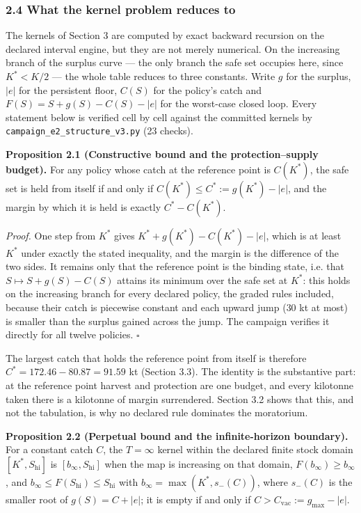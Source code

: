 \documentclass[11pt]{article}
\begin{document}
\subsubsection{2.4 What the kernel problem reduces
to}\label{budget-what-the-kernel-problem-reduces-to}

The kernels of Section 3 are computed by exact backward recursion on the
declared interval engine, but they are not merely numerical. On the increasing
branch of the surplus curve --- the only branch the safe set occupies here,
since \(K^* < K/2\) --- the whole table reduces to three constants. Write
\(g\) for the surplus, \(|e|\) for the persistent floor, \(C(S)\) for the
policy's catch and \(F(S) = S + g(S) - C(S) - |e|\) for the worst-case closed
loop. Every statement below is verified cell by cell against the committed
kernels by \texttt{campaign\_e2\_structure\_v3.py} (23 checks).

\textbf{Proposition 2.1 (Constructive bound and the protection--supply
budget).} For any policy whose catch at the reference point is \(C(K^*)\),
the safe set is held from itself if and only if
\(C(K^*) \le C^* := g(K^*) - |e|\), and the margin by which it is held is
exactly \(C^* - C(K^*)\).

\emph{Proof.} One step from \(K^*\) gives
\(K^* + g(K^*) - C(K^*) - |e|\), which is at least \(K^*\) under exactly the
stated inequality, and the margin is the difference of the two sides. It
remains only that the reference point is the binding state, i.e. that
\(S \mapsto S + g(S) - C(S)\) attains its minimum over the safe set at
\(K^*\): this holds on the increasing branch for every declared policy, the
graded rules included, because their catch is piecewise constant and each
upward jump (\(30\) kt at most) is smaller than the surplus gained across the
jump. The campaign verifies it directly for all twelve policies.
\ensuremath{\square}

The largest catch that holds the reference point from itself is therefore
\(C^* = 172.46 - 80.87 = 91.59\) kt (Section 3.3). The identity is the
substantive part: at the reference point harvest and protection are one
budget, and every kilotonne taken there is a kilotonne of margin surrendered.
Section 3.2 shows that this, and not the tabulation, is why no declared rule
dominates the moratorium.

\textbf{Proposition 2.2 (Perpetual bound and the infinite-horizon
boundary).} For a constant catch \(C\), the \(T=\infty\) kernel within the declared finite stock domain
\([K^*,S_{\mathrm{hi}}]\) is
\([b_\infty, S_{\mathrm{hi}}]\) when the map is increasing on
that domain, \(F(b_\infty)\ge b_\infty\), and
\(b_\infty\le F(S_{\mathrm{hi}})\le S_{\mathrm{hi}}\) with \(b_\infty = \max(K^*, s_-(C))\), where
\(s_-(C)\) is the smaller root of \(g(S) = C + |e|\); it is empty if and only
if \(C > C_{\mathrm{vac}} := g_{\max} - |e|\).
\end{document}
